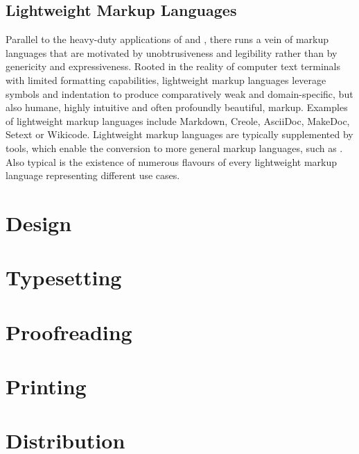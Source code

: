 \documentclass{book}
\begin{document}
      \section{Lightweight Markup Languages}
        Parallel to the heavy-duty applications of  and
        , there runs a vein of markup languages that are motivated
        by unobtrusiveness and legibility rather than by genericity and
        expressiveness. Rooted in the reality of computer text terminals with
        limited formatting capabilities, lightweight markup languages leverage
        symbols and indentation to produce comparatively weak and
        domain-specific, but also humane, highly intuitive and often profoundly
        beautiful, markup.  Examples of lightweight markup languages include
        Markdown, Creole, AsciiDoc, MakeDoc, Setext or Wikicode. Lightweight
        markup languages are typically supplemented by tools, which enable the
        conversion to more general markup languages, such as .
        Also typical is the existence of numerous flavours of every lightweight
        markup language representing different use cases.


    \chapter{Design}
    \chapter{Typesetting}
    \chapter{Proofreading}
    \chapter{Printing}
    \chapter{Distribution}
\end{document}
